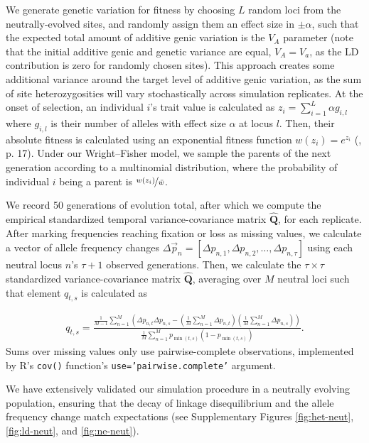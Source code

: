 \documentclass[11pt]{article}
\newcommand{\E}{\mathbb{E}}
\DeclareMathOperator{\cov}{Cov}
\begin{document}
We generate genetic variation for fitness by choosing $L$ random loci from the
neutrally-evolved sites, and randomly assign them an effect size in $\pm
\alpha$, such that the expected total amount of additive genic variation is the
$V_A$ parameter (note that the initial additive genic and genetic variance are
equal, $V_A = V_a$, as the LD contribution is zero for randomly chosen sites).
This approach creates some additional variance around the target level of
additive genic variation, as the sum of site heterozygosities will vary
stochastically across simulation replicates. At the onset of selection, an
individual $i$'s trait value is calculated as $z_i = \sum_{i=1}^L \alpha
g_{i,l}$ where $g_{i,l}$ is their number of alleles with effect size $\alpha$
at locus $l$.  Then, their absolute fitness is calculated using an exponential
fitness function $w(z_i) = e^{z_i}$ (\cite{Turelli1990-kd}, p. 17). Under our
Wright--Fisher model, we sample the parents of the next generation according to
a multinomial distribution, where the probability of individual $i$ being a
parent is $\nicefrac{w(z_i)}{\bar{w}}$. 

We record 50 generations of evolution total, after which we compute the
empirical standardized temporal variance-covariance matrix
$\widehat{\mathbf{Q}}$, for each replicate. After marking frequencies reaching
fixation or loss as missing values, we calculate a vector of allele frequency
changes $\Delta \vec{p}_n = [\Delta p_{n,1}, \Delta p_{n,2}, \ldots, \Delta
p_{n,\tau}]$ using each neutral locus $n$'s $\tau+1$ observed generations.
Then, we calculate the $\tau \times \tau$ standardized variance-covariance
matrix $\widehat{\mathbf{Q}}$, averaging over $M$ neutral loci such that
element $q_{t,s}$ is calculated as

\begin{align}
  q_{t,s} = \frac{\frac{1}{M - 1} \sum_{n=1}^M \left( \Delta p_{n,t} \Delta p_{n,s} - \left(\frac{1}{M} \sum_{n=1}^M \Delta p_{n,t}\right) \left( \frac{1}{M} \sum_{n=1}^M \Delta p_{n,s} \right) \right)}{
  \frac{1}{M} \sum_{n=1}^M p_{\min(t,s)} \left(1 - p_{\min(t,s)}\right)
  }.
  \label{eq:ave-temp-autocov}
\end{align}
%
Sums over missing values only use pairwise-complete observations, implemented
by R's \texttt{cov()} function's \texttt{use='pairwise.complete'} argument.

We have extensively validated our simulation procedure in a neutrally evolving
population, ensuring that the decay of linkage disequilibrium and the allele
frequency change match expectations (see Supplementary Figures
\ref{fig:het-neut}, \ref{fig:ld-neut}, and \ref{fig:ne-neut}). 
\end{document}
